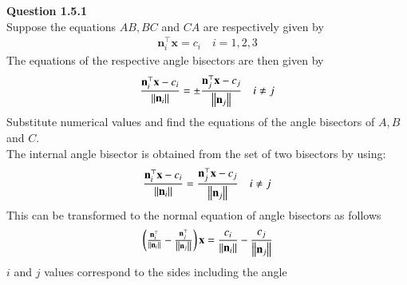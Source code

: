 \documentclass[journal,12pt,twocolumn]{IEEEtran}
\begin{document}
\let\vec\mathbf




\vspace{3cm}

\textbf{Question 1.5.1}\\
Suppose the equations $AB, BC$ and $CA$ are respectively given by 
		\begin{align}
			\label{eq:tri-sides}
			\vec{n}_i^{\top}\vec{x}=c_i \quad i = 1, 2, 3 
		\end{align}
		The equations of the respective angle bisectors are then given by 
		\begin{align}
			\frac{\vec{n}_i^{\top}\vec{x}-c_i}{\norm{\vec{n}_i}}
		=
	\pm	\frac{\vec{n}_j^{\top}\vec{x}-c_j}{\norm{\vec{n}_j}}
\quad i \ne j
		\end{align}
		Substitute numerical values and find the equations of the angle bisectors of $A, B$ and $C$.\\
\fi
\solution 
The internal angle bisector is obtained from the set of two bisectors by using:
		\begin{align}
			\frac{\vec{n}_i^{\top}\vec{x}-c_i}{\norm{\vec{n}_i}}
		=
		\frac{\vec{n}_j^{\top}\vec{x}-c_j}{\norm{\vec{n}_j}}
\quad i \ne j	
\end{align}
This can be transformed to the normal equation of angle bisectors as follows 
\begin{align}
       \myvec{\frac{\vec{n}_i^{\top}}{\norm{\vec{n}_i}} - \frac{\vec{n}_j^{\top}}{\norm{\vec{n}_j}}}\vec{x}
       =
       \frac{c_i}{\norm{\vec{n}_i}}-\frac{c_j}{\norm{\vec{n}_j}}
\end{align}
$i$ and $j$ values correspond to the sides including the angle\\
\end{document}
